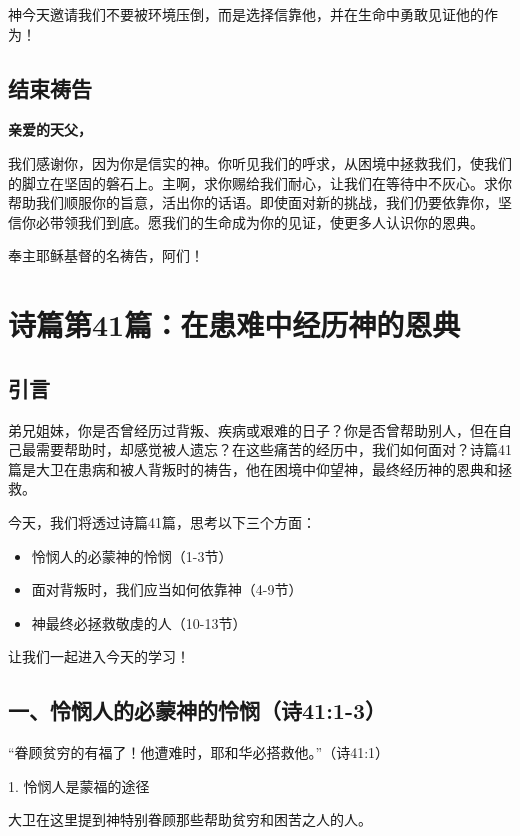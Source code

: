 \documentclass[a4paper, 12pt]{article}
\begin{document}
神今天邀请我们不要被环境压倒，而是选择信靠他，并在生命中勇敢见证他的作为！

\subsection*{结束祷告}
\textbf{亲爱的天父，}

我们感谢你，因为你是信实的神。你听见我们的呼求，从困境中拯救我们，使我们的脚立在坚固的磐石上。主啊，求你赐给我们耐心，让我们在等待中不灰心。求你帮助我们顺服你的旨意，活出你的话语。即使面对新的挑战，我们仍要依靠你，坚信你必带领我们到底。愿我们的生命成为你的见证，使更多人认识你的恩典。

奉主耶稣基督的名祷告，阿们！
\newpage
\section{诗篇第41篇：在患难中经历神的恩典}
\subsection*{引言}
\hspace{0.6cm}弟兄姐妹，你是否曾经历过背叛、疾病或艰难的日子？你是否曾帮助别人，但在自己最需要帮助时，却感觉被人遗忘？在这些痛苦的经历中，我们如何面对？诗篇41篇是大卫在患病和被人背叛时的祷告，他在困境中仰望神，最终经历神的恩典和拯救。

今天，我们将透过诗篇41篇，思考以下三个方面：
\begin{itemize}
    \item 怜悯人的必蒙神的怜悯（1-3节）

    \item 面对背叛时，我们应当如何依靠神（4-9节）

    \item 神最终必拯救敬虔的人（10-13节）

\end{itemize}

让我们一起进入今天的学习！

\subsection*{一、怜悯人的必蒙神的怜悯（诗41:1-3）}
“眷顾贫穷的有福了！他遭难时，耶和华必搭救他。”（诗41:1）

1. 怜悯人是蒙福的途径

大卫在这里提到神特别眷顾那些帮助贫穷和困苦之人的人。
\end{document}
